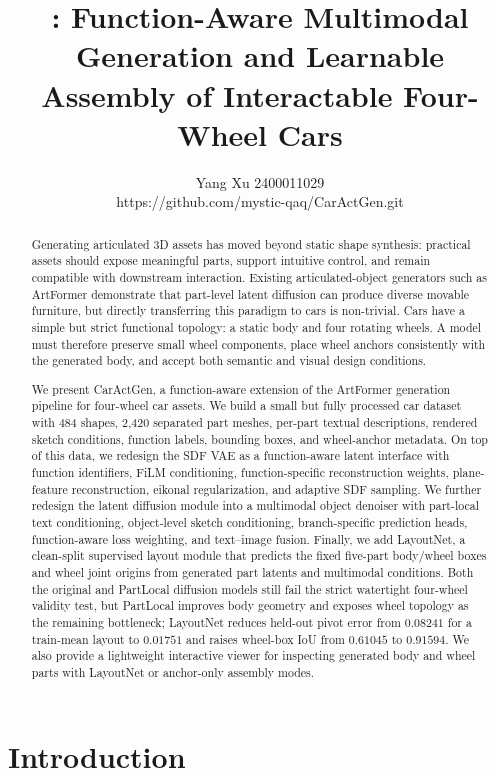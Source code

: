 \documentclass[10pt]{article}
\title{\textbf{\method}: Function-Aware Multimodal Generation and Learnable Assembly of Interactable Four-Wheel Cars}
\author{Yang Xu 2400011029 \\ https://github.com/mystic-qaq/CarActGen.git}
\date{}
\newcommand{\method}{CarActGen\xspace}
\newcommand{\artformer}{ArtFormer\xspace}
\begin{document}
\maketitle

\begin{abstract}
Generating articulated 3D assets has moved beyond static shape synthesis: practical assets should expose meaningful parts, support intuitive control, and remain compatible with downstream interaction. Existing articulated-object generators such as \artformer demonstrate that part-level latent diffusion can produce diverse movable furniture, but directly transferring this paradigm to cars is non-trivial. Cars have a simple but strict functional topology: a static body and four rotating wheels. A model must therefore preserve small wheel components, place wheel anchors consistently with the generated body, and accept both semantic and visual design conditions.

We present \method, a function-aware extension of the \artformer generation pipeline for four-wheel car assets. We build a small but fully processed car dataset with 484 shapes, 2,420 separated part meshes, per-part textual descriptions, rendered sketch conditions, function labels, bounding boxes, and wheel-anchor metadata. On top of this data, we redesign the SDF VAE as a function-aware latent interface with function identifiers, FiLM conditioning, function-specific reconstruction weights, plane-feature reconstruction, eikonal regularization, and adaptive SDF sampling. We further redesign the latent diffusion module into a multimodal object denoiser with part-local text conditioning, object-level sketch conditioning, branch-specific prediction heads, function-aware loss weighting, and text--image fusion. Finally, we add LayoutNet, a clean-split supervised layout module that predicts the fixed five-part body/wheel boxes and wheel joint origins from generated part latents and multimodal conditions. Both the original and PartLocal diffusion models still fail the strict watertight four-wheel validity test, but PartLocal improves body geometry and exposes wheel topology as the remaining bottleneck; LayoutNet reduces held-out pivot error from $0.08241$ for a train-mean layout to $0.01751$ and raises wheel-box IoU from $0.61045$ to $0.91594$. We also provide a lightweight interactive viewer for inspecting generated body and wheel parts with LayoutNet or anchor-only assembly modes.
\end{abstract}

\section{Introduction}
\end{document}
